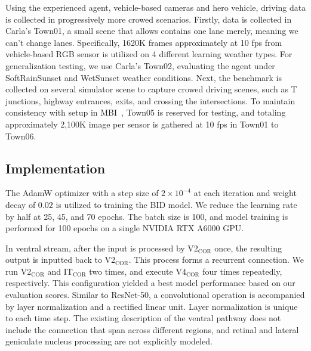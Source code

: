 Using the experienced agent, vehicle-based cameras and hero vehicle, driving data is collected in progressively more crowed scenarios.
Firstly, data is collected in Carla's Town01, a small scene that allows contains one lane merely, meaning we can't change lanes.
Specifically, 1620K frames approximately at 10 fps from vehicle-based RGB sensor is utilized on 4 different learning weather types.
For generalization testing, we use Carla's Town02, evaluating the agent under SoftRainSunset and WetSunset weather conditions. 
Next, the benchmark is collected on several simulator scene to capture crowed driving scenes, such as T junctions, highway entrances, exits, and crossing the intersections. 
To maintain consistency with setup in MBI~\cite{Hu:2022}, Town05 is reserved for testing, and totaling approximately 2,100K image per sensor is gathered at 10 fps in Town01 to Town06. 



\subsection{Implementation}

\hspace{1pc}The AdamW optimizer with a step size of $2 \times 10^{-4}$ at each iteration and weight decay of $0.02$ is utilized to training the BID model. 
We reduce the learning rate by half at 25, 45, and 70 epochs.
The batch size is 100, 
and model training is performed for 100 epochs on a single NVIDIA RTX A6000 GPU.


In ventral stream, after the input is processed by V2$_\text{COR}$ once, the resulting output is inputted back to V2$_\text{COR}$.
This process forms a recurrent connection.
We run V2$_\text{COR}$ and IT$_\text{COR}$ two times, and execute V4$_\text{COR}$ four times repeatedly, respectively.
This configuration yielded a best model performance based on our evaluation scores.
Similar to ResNet-50, a convolutional operation is accompanied by layer normalization and a rectified linear unit.
Layer normalization is unique to each time step.
The existing description of the ventral pathway does not include the connection that span across different regions, and retinal and lateral geniculate nucleus processing are not explicitly modeled.


